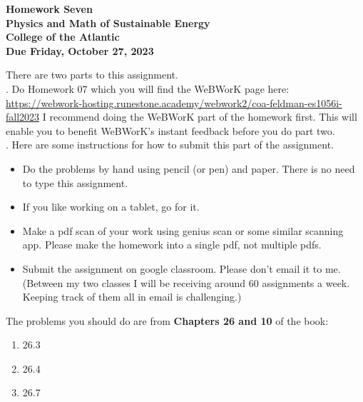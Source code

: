 \documentclass[12pt]{article}
\begin{document}
\pagestyle{empty}
 
\begin{center}
{\LARGE {\bf Homework Seven}}\\
\bigskip
{\Large {\bf Physics and Math of Sustainable Energy}}\\
\bigskip
{\Large {\bf College of the Atlantic}}\\
\bigskip
{ {\bf Due Friday, October 27, 2023}}\\ 
\end{center}
\medskip


\noindent There are two parts to this assignment.\\

.  Do Homework 07 which you
will find the WeBWorK page here:
\url{https://webwork-hosting.runestone.academy/webwork2/coa-feldman-es1056i-fall2023}
I recommend doing the WeBWorK part of the homework first.  This will
enable you to benefit WeBWorK's instant feedback before you do part
two.\\ 


.  Here are some
instructions for how to submit this part of the assignment.
\begin{itemize}
\item Do the problems by hand using pencil (or pen) and paper.
  There is no need to type this assignment.
\item If you like working on a tablet, go for it. 
\item Make a pdf scan of your work using genius scan or some
  similar scanning app.  Please make the homework into a single
  pdf, not multiple pdfs.
\item Submit the assignment on google classroom.  Please don't
  email it to me.  (Between my two classes I will be receiving
  around 60 assignments a week.  Keeping track of them all in email 
  is challenging.)\\
\end{itemize}



\noindent The problems you should do are from {\bf Chapters 26 and 10} of the book:  \\ 

\begin{enumerate}
  \setlength{\itemsep}{-1mm}
\item 26.3
\item 26.4
\item 26.7
\end{enumerate}
\end{document}
